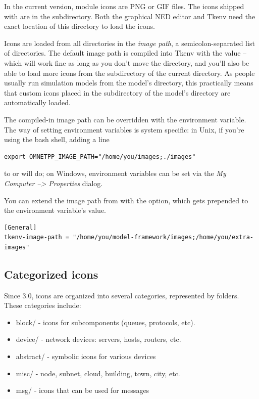 In the current {\opp} version, module icons are PNG or GIF files. The icons shipped
with {\opp} are in the  subdirectory. Both the graphical NED editor
and Tkenv need the exact location of this directory to load the icons.

Icons are loaded from all directories in the \textit{image path},
a semicolon-separated list of directories.
The default image path is compiled into Tkenv with the value
 -- which will work fine
as long as you don't move the directory, and you'll also be able to
load more icons from the  subdirectory of the current
directory. As people usually run simulation models from the model's
directory, this practically means that custom icons placed in the
 subdirectory of the model's directory are automatically
loaded.

The compiled-in image path can be overridden with the 
environment variable. The way of setting environment variables is system
specific: in Unix, if you're using the bash shell, adding a line

\begin{verbatim}
export OMNETPP_IMAGE_PATH="/home/you/images;./images"
\end{verbatim}

to  or  will do; on Windows, environment variables
can be set via the \textit{My Computer --> Properties} dialog.

You can extend the image path from  with the 
 option, which gets prepended to the environment
variable's value.

\begin{verbatim}
[General]
tkenv-image-path = "/home/you/model-framework/images;/home/you/extra-images"
\end{verbatim}


\subsection{Categorized icons}

Since {\opp} 3.0, icons are organized into several categories, represented
by folders. These categories include:

\begin{itemize}
  \item block/ - icons for subcomponents (queues, protocols, etc).
  \item device/ - network devices: servers, hosts, routers, etc.
  \item abstract/ - symbolic icons for various devices
  \item misc/ - node, subnet, cloud, building, town, city, etc.
  \item msg/ - icons that can be used for messages
\end{itemize}

